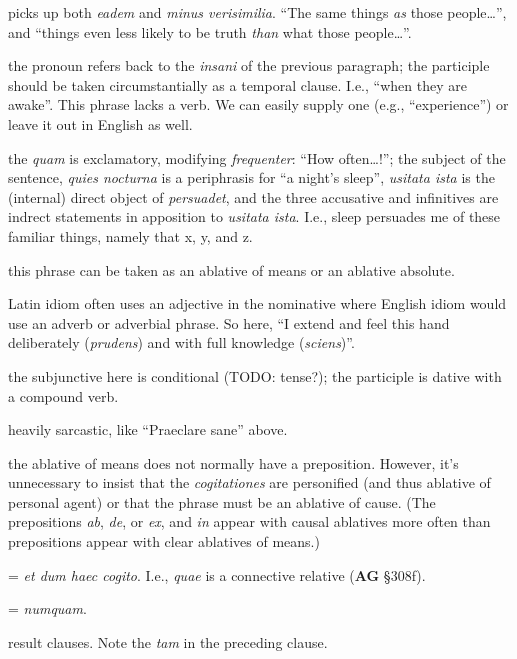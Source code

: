  picks up both \textit{eadem} and \textit{minus verisimilia}. ``The same things \textit{as} those people\dots'', and ``things even less likely to be truth \textit{than} what those people\dots''.

 the pronoun refers back to the \textit{insani} of the previous paragraph; the participle should be taken circumstantially as a temporal clause. I.e., ``when they are awake''. This phrase lacks a verb. We can easily supply one (e.g., ``experience'') or leave it out in English as well.

 the \textit{quam} is exclamatory, modifying \textit{frequenter}: ``How often\dots !''; the subject of the sentence, \textit{quies nocturna} is a periphrasis for ``a night's sleep'', \textit{usitata ista} is the (internal) direct object of \textit{persuadet}, and the three accusative and infinitives are indrect statements in apposition to \textit{usitata ista}. I.e., sleep persuades me of these familiar things, namely that x, y, and z.

 this phrase can be taken as an ablative of means or an ablative absolute.

 Latin idiom often uses an adjective in the nominative where English idiom would use an adverb or adverbial phrase. So here, ``I extend and feel this hand deliberately (\textit{prudens}) and with full knowledge (\textit{sciens})''.

 the subjunctive here is conditional (TODO: tense?); the participle is dative with a compound verb.

 heavily sarcastic, like ``Praeclare sane'' above.

 the ablative of means does not normally have a preposition. However, it's unnecessary to insist that the \textit{cogitationes} are personified (and thus ablative of personal agent) or that the phrase must be an ablative of cause. (The prepositions \textit{ab}, \textit{de}, or \textit{ex}, and \textit{in} appear with causal ablatives more often than prepositions appear with clear ablatives of means.)

 = \textit{et dum haec cogito}. I.e., \textit{quae} is a connective relative (\textbf{AG} §308f).

 = \textit{numquam}.

 result clauses. Note the \textit{tam} in the preceding clause.

